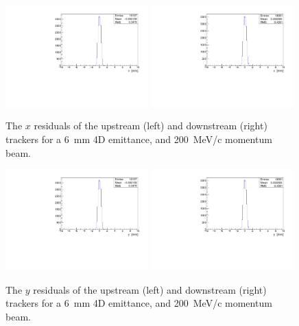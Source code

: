   \begin{figure}[p]
    \begin{center}
      \includegraphics[width=0.49\textwidth, angle=0]{08-Performance/upstream_x_residudal.pdf}
      \includegraphics[width=0.49\textwidth, angle=0]{08-Performance/downstream_x_residudal.pdf}
      \caption{\label{fig:XResidKalman} The $x$ residuals of the upstream (left) and downstream (right) trackers for a 6~mm 4D emittance, and 200~MeV/c momentum beam.}
    \end{center}
  \end{figure}
  
    \begin{figure}[p]
    \begin{center}
      \includegraphics[width=0.49\textwidth, angle=0]{08-Performance/upstream_y_residudal.pdf}
      \includegraphics[width=0.49\textwidth, angle=0]{08-Performance/downstream_y_residudal.pdf}
      \caption{\label{fig:YResidKalman} The $y$ residuals of the upstream (left) and downstream (right) trackers for a 6~mm 4D emittance, and 200~MeV/c momentum beam.}
    \end{center}
  \end{figure}
  
